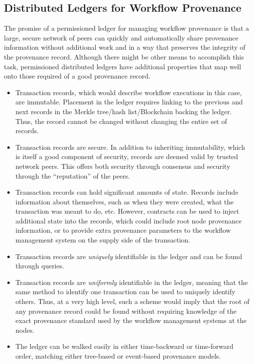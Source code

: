 \subsection{Distributed Ledgers for Workflow Provenance}
\label{case}
The promise of a permissioned ledger for managing workflow provenance is that a
large, secure network of peers can quickly and automatically share provenance
information without additional work and in a way that preserves the integrity
of the provenance record. Although there might be other means to accomplish this
task, permissioned distributed ledgers have additional properties that map well
onto those required of a good provenance record.
\begin{itemize}
    \item Transaction records, which would describe workflow executions in this
    case, are immutable. Placement in the ledger requires linking to the
    previous and next records in the Merkle tree/hash list/Blockchain backing
    the ledger. Thus, the record cannot be changed without changing the entire
    set of records.
    \item Transaction records are secure. In addition to inheriting
    immutability, which is itself a good component of security, records are
    deemed valid by trusted network peers. This offers both security through
    consensus and security through the ``reputation'' of the peers.
    \item Transaction records can hold significant amounts of state. Records
    include information about themselves, such as when they were created, what
    the transaction was meant to do, etc. However, contracts can be used to
    inject additional state into the records, which could include root node
    provenance information, or to provide extra provenance parameters to the
    workflow management system on the supply side of the transaction.
    \item Transaction records are \textit{uniquely} identifiable in the ledger
    and can be found through queries.
    \item Transaction records are \textit{uniformly} identifiable in the ledger,
    meaning that the same method to identify one transaction can be used to
    uniquely identify others. Thus, at a very high level, such a scheme would
    imply that the root of any provenance record could be found without
    requiring knowledge of the exact provenance standard used by the workflow
    management systems at the nodes.
    \item The ledger can be walked easily in either time-backward or
    time-forward order, matching either tree-based or event-based provenance
    models.
\end{itemize}

